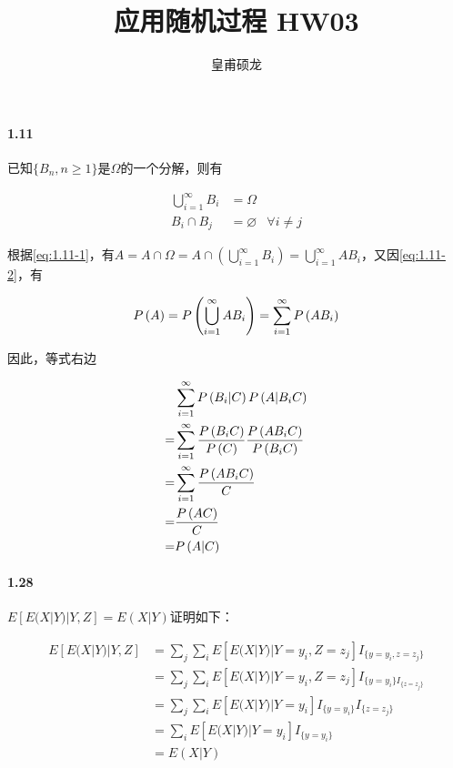 \documentclass{article}
\title{应用随机过程 HW03}
\author{皇甫硕龙}
\begin{document}
    \maketitle

    \paragraph*{1.11} 已知$\{B_n, n\geq 1\}$是$\Omega$的一个分解，则有

    \begin{eqnarray}
        \bigcup _{i=1}^\infty B_i &= \Omega \label{eq:1.11-1} \\
        B_i \cap B_j &= \varnothing & \forall i\not = j \label{eq:1.11-2}
    \end{eqnarray}

    根据\eqref{eq:1.11-1}，有$A = A\cap \Omega = A\cap \left(\bigcup _{i=1}^\infty B_i\right) = \bigcup _{i=1}^\infty AB_i$，又因\eqref{eq:1.11-2}，有

    \begin{equation}
        P\left(A\right) = P\left(\bigcup _{i=1}^\infty AB_i\right) = \sum_{i=1}^\infty P\left(AB_i\right)
    \end{equation}

    因此，等式右边

    \begin{equation}
        \begin{aligned}
            &\sum_{i=1}^\infty P\left(B_i|C\right) P\left(A|B_iC\right) \\
            =&\sum_{i=1}^\infty \frac{P\left(B_iC\right)}{P\left(C\right)} \frac{P\left(AB_iC\right)}{P\left(B_iC\right)} \\
            =&\sum_{i=1}^\infty \frac{P\left(AB_iC\right)}{C} \\
            =&\frac{P\left(AC\right)}{C} \\
            =&P\left(A|C\right)
        \end{aligned}
    \end{equation}

    \paragraph*{1.28}

    $E[E(X|Y)|Y, Z] = E(X|Y)$证明如下：

    \begin{equation}
        \begin{aligned}
            E[E(X|Y)|Y, Z] &= \sum_j \sum_i E[E(X|Y)|Y=y_i, Z=z_j]I_{\{y=y_i, z=z_j\}} \\
            &= \sum_j \sum_i E[E(X|Y)|Y=y_i, Z=z_j]I_{\{y=y_i\}I_{\{z=z_j\}}} \\
            &= \sum_j \sum_i E[E(X|Y)|Y=y_i]I_{\{y=y_i\}}I_{\{z=z_j\}} \\
            &= \sum_i E[E(X|Y)|Y=y_i]I_{\{y=y_i\}} \\
            &= E(X|Y)
        \end{aligned}
    \end{equation}
\end{document}
